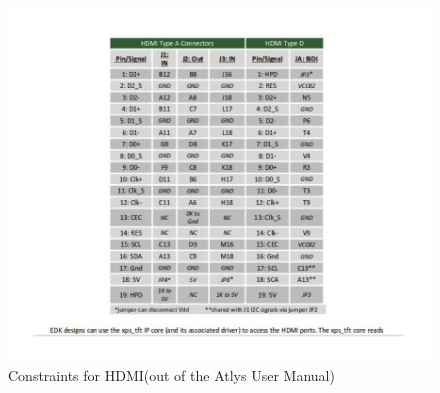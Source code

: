\begin{figure}[h!]
\includegraphics[scale=1.1]{images/hdmi_constraints.png} 

\caption{Constraints for HDMI(out of the Atlys User Manual)}
\label{hdmi_constraints}
\end{figure}

